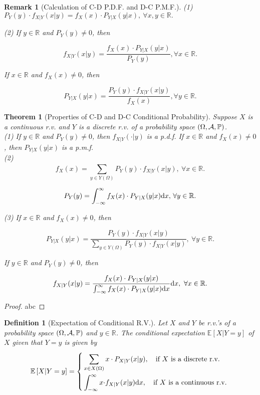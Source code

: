 \documentclass[openany,12pt]{book}
\newtheorem{theorem}{Theorem}[chapter]
\newtheorem{remark}{Remark}[chapter]
\newtheorem{definition}{Definition}[chapter]
\begin{document}
\begin{remark}[Calculation of C-D P.D.F. and D-C P.M.F.]
(1)
$P_{Y}(y) \cdot f_{X|Y}(x|y) = f_{X}(x) \cdot P_{Y|X}(y|x),\ \forall x,y \in \mathbb{R}.$

(2) If $y \in \mathbb{R}$ and $P_{Y}(y) \neq 0$, then

\[f_{X|Y}(x|y) = \frac{f_{X}(x) \cdot P_{Y|X}(y|x)}{P_{Y}(y)},\forall x \in \mathbb{R}.\]

If $x \in \mathbb{R}$ and $f_{X}(x) \neq 0$, then

\[P_{Y|X}(y|x) = \frac{P_{Y}(y) \cdot f_{X|Y}(x|y)}{f_{X}(x)},\forall y \in \mathbb{R}.\]

\end{remark}

\begin{theorem}[Properties of C-D and D-C Conditional Probability]
Suppose $X$ is a continuous r.v. and $Y$ is a discrete r.v. of a probability space $(\Omega,\mathcal{A},\mathbb{P})$.\\
(1) If $y \in \mathbb{R}$ and $P_{Y}(y) \neq 0$, then
$f_{X|Y}\left( \cdot | y \right)$ is a p.d.f. If $x \in \mathbb{R}$ and $f_{X}(x) \neq 0$, then $P_{Y|X}(y|x)$ is a p.m.f.\\
(2)
\[f_{X}(x) = \sum_{y \in Y(\Omega)}^{}{P_{Y}(y) \cdot f_{X|Y}(x|y)},\ \forall x \in \mathbb{R}.\]

\[P_{Y}(y) = \int_{- \infty}^{\infty}{f_{X}(x) \cdot P_{Y|X}(y|x)\mathrm{d} x,}\ \forall y \in \mathbb{R}.\]

(3) If $x \in \mathbb{R}$ and $f_{X}(x) \neq 0$, then

\[P_{Y|X}(y|x) = \frac{P_{Y}(y) \cdot f_{X|Y}(x|y)}{\sum_{y \in Y(\Omega)}^{}{P_{Y}(y) \cdot f_{X|Y}(x|y)}},\ \forall y \in \mathbb{R}.\]

If $y \in \mathbb{R}$ and $P_{Y}(y) \neq 0$, then

\[f_{X|Y}(x|y) = \frac{f_{X}(x) \cdot P_{Y|X}(y|x)}{\int_{- \infty}^{\infty}{f_{X}(x) \cdot P_{Y|X}(y|x)\mathrm{d} x}}\mathrm{d} x,\ \forall x \in \mathbb{R}.\]
\end{theorem}

\begin{proof}
  abc
\end{proof}

\begin{definition}[Expectation of Conditional R.V.]
Let $X$ and $Y$ be r.v.'s of a probability space $(\Omega,\mathcal{A},\mathbb{P})$ and
$y \in \mathbb{R}$. The conditional expectation $\mathbb{E}[ X|Y = y]$ of $X$ given that $Y = y$ is given by
\[\mathbb{E}\left[ X | Y = y \right] = \left\{ \begin{aligned}
&\sum_{x \in X(\Omega)}^{}{x \cdot P_{X|Y}(x|y),\quad \mathrm{\text{if\ }}X\mathrm{\text{\ is\ a\ discrete\ r.v.}}} \\
&\int_{- \infty}^{\infty}{x \cdot}f_{X|Y}(x|y)\mathrm{d} x,\quad\mathrm{\text{if\ }}X\mathrm{\text{\ is\ a\ continuous\ r.v.}} \\
\end{aligned} \right.\ \]
\end{definition}
\end{document}
